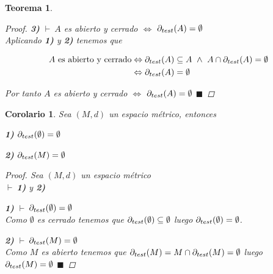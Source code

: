 \documentclass[oneside]{book} %
\theoremstyle{Teorema}
\newtheorem{Teorema}[Definicion]{Teorema}
\newtheorem{Corolario}[Definicion]{Corolario}
\theoremstyle{Ejemplos}
\theoremstyle{[Obs]}
\def \test {test}
\newcommand{\frontera}[2][\test]{\ifx \test #1 {\partial(#2)} \else {\partial_{#1}(#2)} \fi} %
\renewcommand{\{}{\left\lbrace} %
\renewcommand{\}}{\right\rbrace} %
\newcommand{\y}{\ \wedge\ } %
\newcommand{\n}{\cap} %
\renewcommand{\sc}{\subseteq} %
\renewcommand{\qed}{$\blacksquare$} %
\newcommand{\pd}{$\vdash\ $} %
\begin{document}
\begin{Teorema}
\begin{proof}
					\textbf{3)} \pd $A$ es abierto y cerrado $\Leftrightarrow$ $\frontera{A} = \emptyset$ \\
					Aplicando \textbf{1)} y \textbf{2)} tenemos que 

					\begin{align*}
						A \text{ es abierto y cerrado} & \Leftrightarrow \frontera{A} \sc A \y A \n \frontera{A} = \emptyset \\ 
						& \Leftrightarrow \frontera{A} = \emptyset
					\end{align*}

					Por tanto $A$ es abierto y cerrado $\Leftrightarrow$ $\frontera{A} = \emptyset$ \qed

				\end{proof}
			
			\end{Teorema}

			\begin{Corolario}\setlength{\parindent}{0em}
			
				Sea $(M, d)$ un espacio métrico, entonces 
			
				\textbf{1)} $\frontera{\emptyset} = \emptyset$ 

				\textbf{2)} $\frontera{M} = \emptyset$ 

				\begin{proof}
					
					Sea $(M, d)$ un espacio métrico \\ 
					\pd \textbf{1)} y \textbf{2)}

					\textbf{1)} \pd $\frontera{\emptyset} = \emptyset$ \\ 
					Como $\emptyset$ es cerrado tenemos que $\frontera{\emptyset} \sc \emptyset$ luego $\frontera{\emptyset} = \emptyset$.

					\textbf{2)} \pd $\frontera{M} = \emptyset$ \\ 
					Como $M$ es abierto tenemos que $\frontera{M} = M \n \frontera{M} = \emptyset$ luego $\frontera{M} = \emptyset$ \qed

				\end{proof}

			\end{Corolario}
\end{document}
